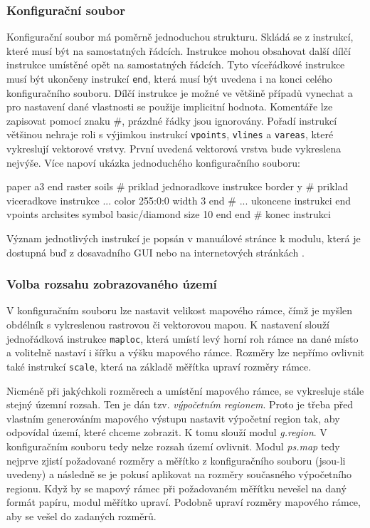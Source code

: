 \documentclass[a4paper,12pt,draft]{article}
\newcommand{\modul}[1]{\emph{#1}}
\newcommand{\instr}[1]{\lstinline[style=psmapInline]|#1|}
\begin{document}
\subsubsection{Konfigurační soubor}
Konfigurační soubor má poměrně jednoduchou strukturu. Skládá se z
instrukcí, které musí být na samostatných řádcích. Instrukce mohou
obsahovat další dílčí instrukce umístěné opět na samostatných
řádcích. Tyto víceřádkové instrukce musí být ukončeny  instrukcí
\instr{end}, která musí být uvedena i na konci celého konfiguračního
souboru. Dílčí instrukce je možné ve většině případů vynechat a
pro nastavení dané vlastnosti se použije implicitní hodnota. Komentáře
lze zapisovat pomocí znaku \#, prázdné řádky jsou ignorovány. Pořadí
instrukcí většinou nehraje roli s výjimkou instrukcí \instr{vpoints},
\instr{vlines} a \instr{vareas}, které vykreslují vektorové vrstvy. První
uvedená vektorová vrstva bude vykreslena nejvýše. Více napoví ukázka
jednoduchého konfiguračního souboru:
\begin{psmap}
paper a3
end
raster soils            # priklad jednoradkove instrukce
border y                # priklad viceradkove instrukce ...
   color 255:0:0
   width 3
end                     # ... ukoncene instrukci end
vpoints archsites
   symbol basic/diamond
   size 10
end
end                     # konec instrukci
\end{psmap}
Význam jednotlivých instrukcí je popsán v manuálové stránce k modulu,
která je dostupná buď z dosavadního GUI nebo na internetových stránkách
\cite{manual}.

\subsubsection{Volba rozsahu zobrazovaného území}
\label{sec:psmap:rozsah}
V konfiguračním souboru lze nastavit velikost mapového rámce, čímž je
myšlen obdélník s vykreslenou rastrovou či vektorovou mapou.  K nastavení
slouží jednořádková instrukce \instr{maploc}, která umístí levý
horní roh rámce na dané místo a volitelně nastaví i šířku a
výšku mapového rámce. Rozměry lze nepřímo ovlivnit také instrukcí
\instr{scale}, která na základě měřítka upraví rozměry rámce.

Nicméně při jakýchkoli rozměrech a umístění mapového rámce, se
vykresluje stále stejný územní rozsah. Ten je dán tzv. \emph{výpočetním
regionem}. Proto je třeba před vlastním generováním mapového výstupu
nastavit výpočetní region tak, aby odpovídal území, které chceme
zobrazit. K tomu slouží modul \modul{g.region}. V konfiguračním souboru
tedy nelze rozsah území ovlivnit.
Modul \modul{ps.map} tedy nejprve zjistí požadované rozměry a měřítko
z konfiguračního souboru (jsou-li uvedeny) a následně se je pokusí
aplikovat na rozměry současného výpočetního regionu. Když by se mapový
rámec při požadovaném měřítku nevešel na daný formát papíru,
modul měřítko upraví. Podobně upraví rozměry mapového rámce, aby
se vešel do zadaných rozměrů.
\end{document}
